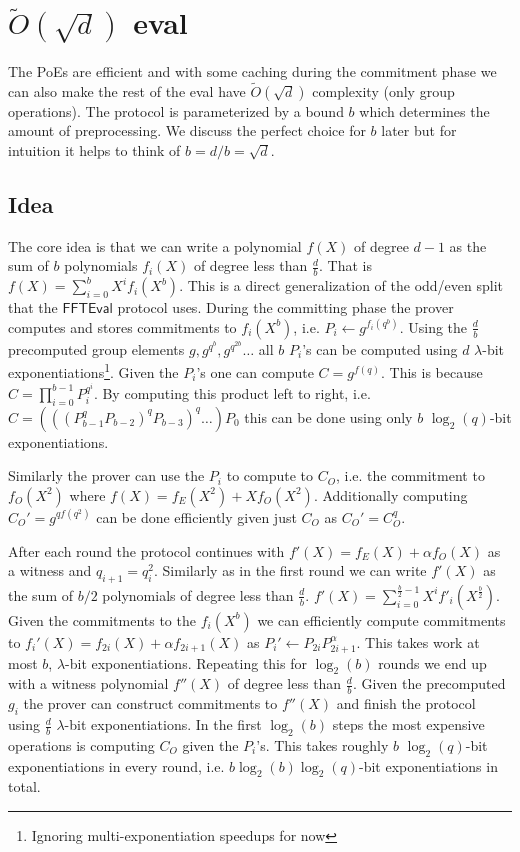 \documentclass[12pt]{article}
\begin{document}
\section{$\tilde{O}(\sqrt{d})$ eval}
The PoEs are efficient and with some caching during the commitment phase we can also make the rest of the eval have $\tilde{O}(\sqrt{d})$ complexity (only group operations). The protocol is parameterized by a bound $b$ which determines the amount of preprocessing. We discuss the perfect choice for $b$ later but for intuition it helps to think of $b=d/b=\sqrt{d}$.
\subsection{Idea}
The core idea is that we can write a polynomial $f(X)$ of degree $d-1$ as the sum of $b$ polynomials $f_i(X)$ of degree less than $\frac{d}{b}$. That is $f(X)=\sum_{i=0}^b X^i f_i(X^b)$. This is a direct generalization of the odd/even split that the $\textsf{FFTEval}$ protocol uses. During the committing phase the prover computes and stores commitments to $f_i(X^b)$, i.e. $P_i\gets g^{f_i(q^b)}$. Using the $\frac{d}{b}$ precomputed group elements $g,g^{q^b},g^{q^{2b}}\dots$ all $b$ $P_i$'s can be computed using $d$ $\lambda$-bit exponentiations\footnote{Ignoring multi-exponentiation speedups for now}. Given the $P_i$'s one can compute $C=g^{f(q)}$. This is because $C=\prod_{i=0}^{b-1} P_i^{q^i}$. By computing this product left to right, i.e. $C=(((P_{b-1}^qP_{b-2})^qP_{b-3})^q \dots)P_0$ this can be done using only $b$ $\log_2(q)$-bit exponentiations.

Similarly the prover can use the $P_i$ to compute to $C_O$, i.e. the commitment to $f_O(X^2)$ where $f(X)=f_E(X^2)+Xf_O(X^2)$. Additionally computing $C_O'=g^{q f(q^2)}$ can be done efficiently given just $C_O$ as $C_O'=C_O^q$. 

After each round the protocol continues with $f'(X)=f_E(X)+\alpha f_O(X)$ as a witness and $q_{i+1}=q_{i}^2$. Similarly as in the first round we can write $f'(X)$ as the sum of $b/2$ polynomials of degree less than $\frac{d}{b}$.
$f'(X)=\sum_{i=0}^{\frac{b}{2}-1} X^i f'_i(X^{\frac{b}{2}})$. Given the commitments to the $f_i(X^b)$ we can efficiently compute commitments to $f_i'(X)=f_{2i}(X)+\alpha f_{2i+1}(X)$ as $P_i'\gets P_{2i}P_{2i+1}^{\alpha}$. This takes work at most $b$, $\lambda$-bit exponentiations. Repeating this for $\log_2(b)$ rounds we end up with a witness polynomial $f''(X)$ of degree less than $\frac{d}{b}$. Given the precomputed $g_i$ the prover can construct commitments to $f''(X)$ and finish the protocol using $\frac{d}{b}$ $\lambda$-bit exponentiations. In the first $\log_2(b)$ steps the most expensive operations is computing $C_O$ given the $P_i$'s. This takes roughly $b$ $\log_2(q)$-bit exponentiations in every round, i.e. $b\log_2(b) \log_2(q)$-bit exponentiations in total.
\end{document}
